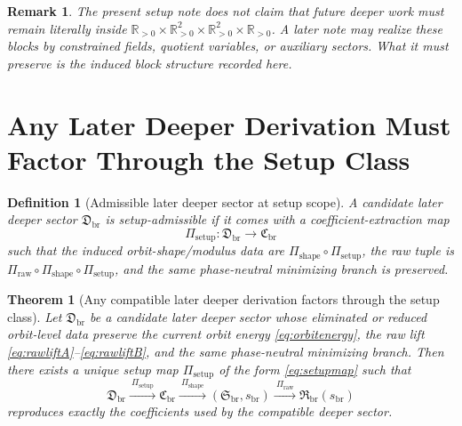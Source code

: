 \documentclass[11pt]{article}
\newcommand{\ShapeTuple}{\mathfrak S_{\mathrm{br}}}
\newcommand{\RawTuple}{\mathfrak R_{\mathrm{br}}}
\newcommand{\ScaleMod}{s_{\mathrm{br}}}
\newcommand{\PrimClass}{\mathfrak C_{\mathrm{br}}}
\newcommand{\PrimMap}{\Pi_{\mathrm{shape}}}
\newcommand{\RawMap}{\Pi_{\mathrm{raw}}}
\newcommand{\SetupMap}{\Pi_{\mathrm{setup}}}
\newtheorem{definition}{Definition}
\newtheorem{remark}{Remark}
\newtheorem{theorem}{Theorem}
\begin{document}
\begin{remark}
The present setup note does not claim that future deeper work must remain literally inside \(\mathbb R_{>0}\times\mathbb R_{>0}^2\times\mathbb R_{>0}^2\times\mathbb R_{>0}\). A later note may realize these blocks by constrained fields, quotient variables, or auxiliary sectors. What it must preserve is the induced block structure recorded here.
\end{remark}

\section{Any Later Deeper Derivation Must Factor Through the Setup Class}

\begin{definition}[Admissible later deeper sector at setup scope]
\label{def:later}
A candidate later deeper sector \(\mathfrak D_{\mathrm{br}}\) is \emph{setup-admissible} if it comes with a coefficient-extraction map
\begin{equation}
\SetupMap:\mathfrak D_{\mathrm{br}}\longrightarrow \PrimClass
\label{eq:setupmap}
\end{equation}
such that the induced orbit-shape/modulus data are \(\PrimMap\circ\SetupMap\), the raw tuple is \(\RawMap\circ\PrimMap\circ\SetupMap\), and the same phase-neutral minimizing branch is preserved.
\end{definition}

\begin{theorem}[Any compatible later deeper derivation factors through the setup class]
\label{thm:factor}
Let \(\mathfrak D_{\mathrm{br}}\) be a candidate later deeper sector whose eliminated or reduced orbit-level data preserve the current orbit energy \eqref{eq:orbitenergy}, the raw lift \eqref{eq:rawliftA}--\eqref{eq:rawliftB}, and the same phase-neutral minimizing branch. Then there exists a unique setup map \(\SetupMap\) of the form \eqref{eq:setupmap} such that
\begin{equation}
\mathfrak D_{\mathrm{br}}
\xrightarrow{\ \SetupMap\ }
\PrimClass
\xrightarrow{\ \PrimMap\ }
(\ShapeTuple,\ScaleMod)
\xrightarrow{\ \RawMap\ }
\RawTuple(\ScaleMod)
\label{eq:factor}
\end{equation}
reproduces exactly the coefficients used by the compatible deeper sector.
\end{theorem}
\end{document}
